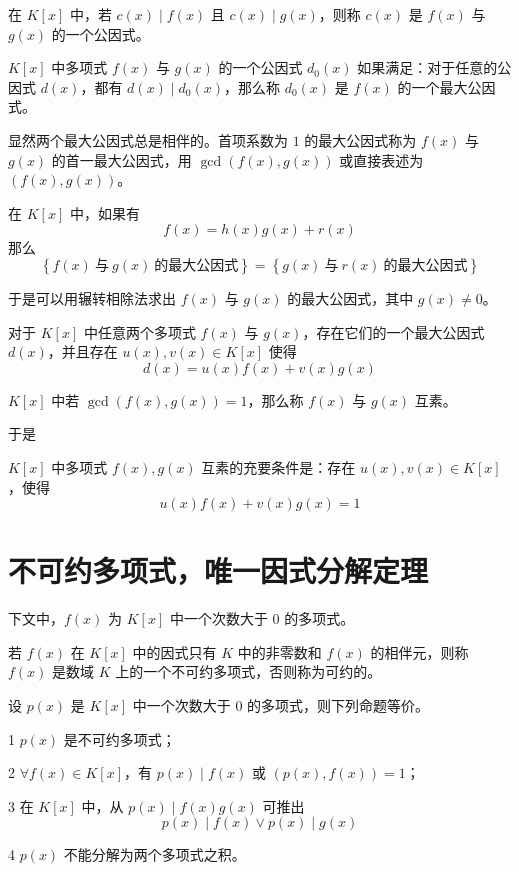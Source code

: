在 $K[x]$ 中，若 $c(x) \mid f(x)$ 且 $c(x) \mid g(x)$，则称 $c(x)$ 是 $f(x)$ 与 $g(x)$ 的一个公因式。

\begin{definition}
    $K[x]$ 中多项式 $f(x)$ 与 $g(x)$ 的一个公因式 $d_0(x)$ 如果满足：对于任意的公因式 $d(x)$，都有 $d(x) \mid d_0(x)$，那么称 $d_0(x)$ 是 $f(x)$ 的一个最大公因式。
\end{definition}

显然两个最大公因式总是相伴的。首项系数为 $1$ 的最大公因式称为 $f(x)$ 与 $g(x)$ 的首一最大公因式，用 $\gcd(f(x), g(x))$ 或直接表述为 $(f(x), g(x))$。

\begin{lemma}
    在 $K[x]$ 中，如果有
    \[f(x) = h(x)g(x) + r(x)\]
    那么
    \[\left\{f(x)\ \text{与}\ g(x)\ \text{的最大公因式}\right\} = \left\{g(x)\ \text{与}\ r(x)\ \text{的最大公因式}\right\}\]
\end{lemma}

于是可以用辗转相除法求出 $f(x)$ 与 $g(x)$ 的最大公因式，其中 $g(x) \ne 0$。

\begin{theorem}
    对于 $K[x]$ 中任意两个多项式 $f(x)$ 与 $g(x)$，存在它们的一个最大公因式 $d(x)$，并且存在 $u(x),v(x) \in K[x]$ 使得
    \[d(x) = u(x)f(x) + v(x)g(x)\]
\end{theorem}

\begin{definition}
    $K[x]$ 中若 $\gcd(f(x), g(x)) = 1$，那么称 $f(x)$ 与 $g(x)$ 互素。 
\end{definition}

于是

\begin{definition}
    $K[x]$ 中多项式 $f(x), g(x)$ 互素的充要条件是：存在 $u(x),v(x) \in K[x]$，使得
    \[u(x)f(x) + v(x)g(x) = 1\]
\end{definition}

\section{不可约多项式，唯一因式分解定理}

下文中，$f(x)$ 为 $K[x]$ 中一个次数大于 $0$ 的多项式。

\begin{definition}
    若 $f(x)$ 在 $K[x]$ 中的因式只有 $K$ 中的非零数和 $f(x)$ 的相伴元，则称 $f(x)$ 是数域 $K$ 上的一个不可约多项式，否则称为可约的。
\end{definition}

\begin{theorem}
    设 $p(x)$ 是 $K[x]$ 中一个次数大于 $0$ 的多项式，则下列命题等价。

    \num{1} $p(x)$ 是不可约多项式；

    \num{2} $\forall f(x) \in K[x]$，有 $p(x) \mid f(x)$ 或 $(p(x), f(x)) = 1$；

    \num{3} 在 $K[x]$ 中，从 $p(x) \mid f(x)g(x)$ 可推出
    \[p(x) \mid f(x) \lor p(x) \mid g(x)\]

    \num{4} $p(x)$ 不能分解为两个多项式之积。
\end{theorem}

